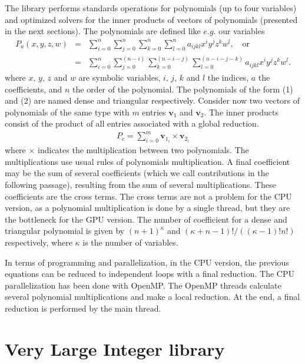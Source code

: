 \documentclass[oribibl]{llncs2e/llncs}
\begin{document}
The library performs standards operations for polynomials (up to four variables) and optimized solvers for  the inner products of vectors of polynomials (presented in the next sections).
The polynomials are defined like  $e.g.$ our variables
\begin{eqnarray}
P_a(x,y,z,w) & = & \sum_{i=0}^n \sum_{j=0}^n  \sum_{k=0}^n \sum_{l=0}^n  a_{ijkl} x^i y^j z^k w^l , \,\,\,\,\,\, \text{or} \\
                   & = & \sum_{i=0}^n \sum_{j=0}^{(n-i)} \sum_{k=0}^{(n-i-j)} \sum_{l=0}^{(n-i-j-k)}  a_{ijkl} x^i y^j z^k w^l  .
\end{eqnarray}
where  $x,\,y,\,z$ and $w$ are symbolic variables,  $i,\,j,\,k$ and $l$  the indices, $a$  the coefficients, and $n$ the order of the polynomial.
The polynomials of the form  (1) and (2) are named dense and triangular respectively. Consider now two vectors of polynomials of the  same type with $m$ 
entries  $\boldsymbol{v}_1$ and  $\boldsymbol{v}_2$. The inner products  consist of the product 
of all entries  associated with a global reduction. 
 \begin{eqnarray}
 P_c = \sum_{i=0}^m \boldsymbol{v}_{1_i} \times  \boldsymbol{v}_{2_i}  \label{poly1} \label{InnerProduct}
\end{eqnarray}
where $\times$ indicates the multiplication between two polynomials. The multiplications use usual rules of polynomials multiplication. 
A final coefficient may be the sum of several coefficients (which we call contributions in the following passage), resulting from the sum of several multiplications. These coefficients are the cross terms. 
The cross terms are not a problem for the CPU version, as a polynomial multiplication is done by a single thread, but they are the bottleneck for the GPU version.
The number of coefficient for a dense and triangular polynomial is given by $(n+1)^{\kappa}$ and  $(\kappa+n-1)! / ( (\kappa-1)! n! )$ respectively, where $\kappa$ is the number of variables. 

In terms of  programming and parallelization, in the CPU version, the previous equations can be reduced to independent loops with a final reduction.
The CPU parallelization has been done with OpenMP. The OpenMP threads calculate several  polynomial multiplications and make a local reduction. At the end, a final reduction is performed  by the main thread.

\section{Very Large Integer library}
\end{document}
